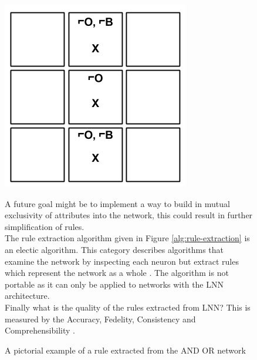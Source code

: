 \begin{figure}[H]
	\centering
	\begin{minipage}[t]{0.3\textwidth}
		\vspace{0px}
		\includegraphics[width=\textwidth]{TicTacToe-RuleExample.png}
		\caption{A pictorial example of a rule extracted from the AND OR network}
		\label{fig:tic-tac-toe-rule-example}
	\end{minipage}
	\hspace{1cm}
	\begin{minipage}[t]{0.6\textwidth}
		\vspace{0px}
		A future goal might be to implement a way to build in mutual exclusivity of attributes into the network, this could result in further simplification of rules.\\

		The rule extraction algorithm given in Figure \ref{alg:rule-extraction} is an electic algorithm. This category describes algorithms that examine the network by inspecting each neuron but extract rules which represent the network as a whole \cite{tickle1998truth}. The algorithm is not portable as it can only be applied to networks with the LNN architecture.\\

	Finally what is the quality of the rules extracted from LNN? This is measured by the Accuracy, Fedelity, Consistency and Comprehensibility \cite{andrews1995survey}.
	\end{minipage}
	\hfill
\end{figure}

